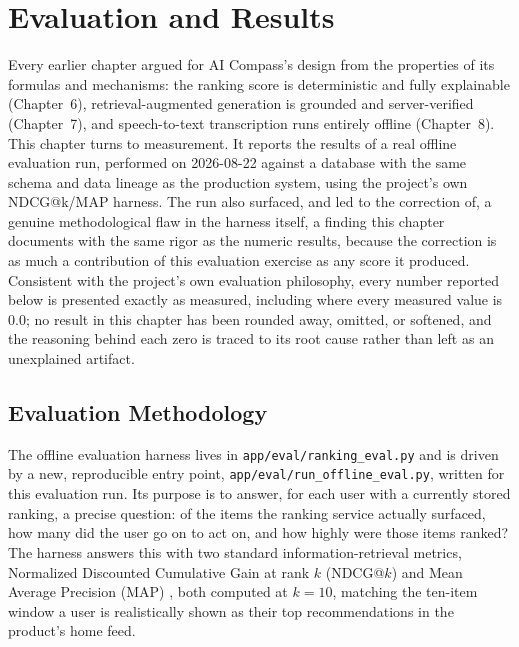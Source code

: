 \chapter{Evaluation and Results}
\label{ch:evaluation}

Every earlier chapter argued for AI Compass's design from the properties of its formulas and mechanisms: the ranking score is deterministic and fully explainable (Chapter~6), retrieval-augmented generation is grounded and server-verified (Chapter~7), and speech-to-text transcription runs entirely offline (Chapter~8). This chapter turns to measurement. It reports the results of a real offline evaluation run, performed on 2026-08-22 against a database with the same schema and data lineage as the production system, using the project's own NDCG@k/MAP harness. The run also surfaced, and led to the correction of, a genuine methodological flaw in the harness itself, a finding this chapter documents with the same rigor as the numeric results, because the correction is as much a contribution of this evaluation exercise as any score it produced. Consistent with the project's own evaluation philosophy, every number reported below is presented exactly as measured, including where every measured value is $0.0$; no result in this chapter has been rounded away, omitted, or softened, and the reasoning behind each zero is traced to its root cause rather than left as an unexplained artifact.

\section{Evaluation Methodology}
\label{sec:eval-methodology}

The offline evaluation harness lives in \texttt{app/eval/ranking\_eval.py} and is driven by a new, reproducible entry point, \texttt{app/eval/run\_offline\_eval.py}, written for this evaluation run. Its purpose is to answer, for each user with a currently stored ranking, a precise question: of the items the ranking service actually surfaced, how many did the user go on to act on, and how highly were those items ranked? The harness answers this with two standard information-retrieval metrics, Normalized Discounted Cumulative Gain at rank $k$ (NDCG@$k$) \cite{jarvelin2002ndcg} and Mean Average Precision (MAP) \cite{manning2008ir}, both computed at $k=10$, matching the ten-item window a user is realistically shown as their top recommendations in the product's home feed.

